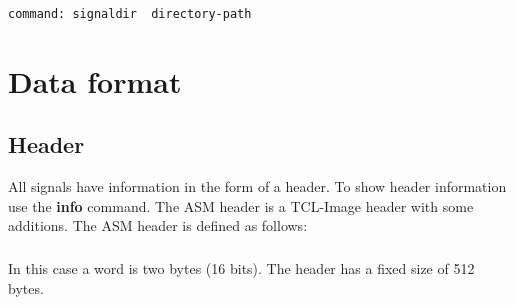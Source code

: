 \documentclass{report}
\newcommand{\bc}{\scriptsize}
\newcommand{\ec}{\normalsize}
\begin{document}
\bc
\begin{verbatim}
command: signaldir  directory-path
\end{verbatim}
\ec


\chapter{Data format}

\section{Header}\label{sec:header}

All signals have information in the form of a header. To show header
information use the \textbf{info} command. The ASM header is a
TCL-Image header with some additions. The ASM header is defined as follows:

\paragraph{}
In this case a word is two bytes (16 bits). The header has a
fixed size of 512 bytes.
\end{document}
